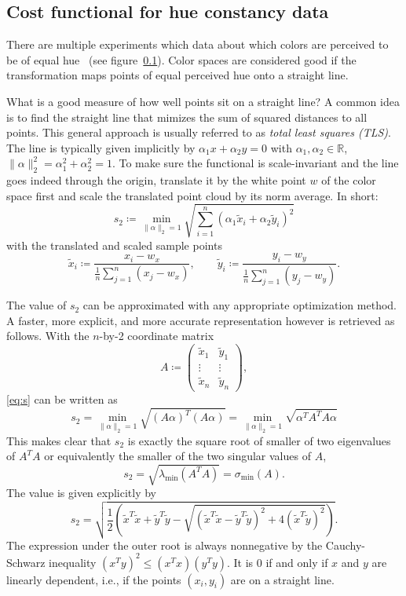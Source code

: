 \documentclass{scrartcl}
\theoremstyle{named}
\newcommand\R{\ensuremath{\mathbb{R}}}
\begin{document}
\subsection{Cost functional for hue constancy data}


There are multiple experiments which data about which colors are perceived to be of
equal hue~\cite{ebner,xiao,hung} (see figure~\ref{}). Color spaces are considered good
if the transformation maps points of equal perceived hue onto a straight line.

What is a good measure of how well points sit on a straight line?
A common idea is to find the straight line that mimizes the sum of squared distances to
all points. This general approach is usually referred to as \emph{total least squares
(TLS)}.
The line is typically given implicitly by $\alpha_1 x + \alpha_2 y
= 0$ with $\alpha_1,\alpha_2\in\R$, $\|\alpha\|_2^2 = \alpha_1^2 + \alpha_2^2 = 1$.
To make sure the functional is scale-invariant and the line goes indeed through the
origin, translate it by the white point $w$ of the color space first and scale the
translated point cloud by its norm average.
In short:
\begin{equation}\label{eq:s}
s_2 \coloneqq
\min_{\|\alpha\|_2=1}
  \sqrt{\sum_{i=1}^n (\alpha_1 \tilde{x}_i + \alpha_2 \tilde{y}_i)^2}
\end{equation}
with the translated and scaled sample points
\[
  \tilde{x}_i \coloneqq \frac{x_i-w_x}{\frac{1}{n}\sum_{j=1}^n (x_j-w_x)},\qquad
  \tilde{y}_i \coloneqq \frac{y_i-w_y}{\frac{1}{n}\sum_{j=1}^n (y_j-w_y)}.
\]

The value of $s_2$ can be approximated with any appropriate optimization method. A
faster, more explicit, and more accurate representation however is retrieved as follows.
With the $n$-by-2 coordinate matrix
\[
  A \coloneqq \begin{pmatrix}
    \tilde{x}_1 & \tilde{y}_1\\
    \vdots & \vdots\\
    \tilde{x}_n & \tilde{y}_n
  \end{pmatrix},
\]
\eqref{eq:s} can be written as
\[
  s_2
  = \min_{\|\alpha\|_2=1} \sqrt{(A \alpha)^T (A \alpha)}
  = \min_{\|\alpha\|_2=1} \sqrt{\alpha^T A^T A \alpha}
\]
This makes clear that $s_2$ is exactly the square root of smaller of two eigenvalues of
$A^TA$ or equivalently the smaller of the two singular values of $A$,
\[
s_2
= \sqrt{\lambda_{\min}(A^T A)}
= \sigma_{\min}(A).
\]
The value is given explicitly by
\begin{equation}\label{eq:s2}
  s_2 = \sqrt{
    \frac{1}{2} \left(
      \tilde{x}^T\tilde{x}
      + \tilde{y}^T\tilde{y}
      - \sqrt{(\tilde{x}^T\tilde{x} - \tilde{y}^T\tilde{y})^2 + 4 (\tilde{x}^T\tilde{y})^2}
      \right)
    }.
\end{equation}
The expression under the outer root is always nonnegative by the Cauchy-Schwarz
inequality $(x^Ty)^2 \le (x^Tx) (y^Ty)$. It is 0 if and only if $x$ and $y$ are linearly
dependent, i.e., if the points $(x_i, y_i)$ are on a straight line.
\end{document}
